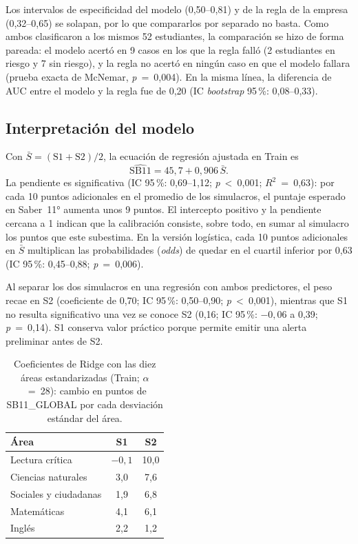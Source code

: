 \documentclass[10pt,letterpaper,twocolumn]{article}
\begin{document}
Los intervalos de especificidad del modelo (0,50--0,81) y de la regla de la empresa (0,32--0,65) se solapan, por lo que compararlos por separado no basta. Como ambos clasificaron a los mismos 52 estudiantes, la comparación se hizo de forma pareada: el modelo acertó en 9 casos en los que la regla falló (2 estudiantes en riesgo y 7 sin riesgo), y la regla no acertó en ningún caso en que el modelo fallara (prueba exacta de McNemar, \textit{p}~=~0,004). En la misma línea, la diferencia de AUC entre el modelo y la regla fue de 0,20 (IC \textit{bootstrap} 95\,\%: 0,08--0,33).

\subsection{Interpretación del modelo}

Con $\bar{S}=(\text{S1}+\text{S2})/2$, la ecuación de regresión ajustada en Train es
\begin{equation}
\label{eq:modelo}
\widehat{\text{SB11}} = 45{,}7 + 0{,}906\,\bar{S}.
\end{equation}
La pendiente es significativa (IC 95\,\%: 0,69--1,12; \textit{p}~<~0,001; $R^2$~=~0,63): por cada 10 puntos adicionales en el promedio de los simulacros, el puntaje esperado en Saber~11° aumenta unos 9 puntos. El intercepto positivo y la pendiente cercana a 1 indican que la calibración consiste, sobre todo, en sumar al simulacro los puntos que este subestima. En la versión logística, cada 10 puntos adicionales en $\bar{S}$ multiplican las probabilidades (\textit{odds}) de quedar en el cuartil inferior por 0,63 (IC 95\,\%: 0,45--0,88; \textit{p}~=~0,006).

Al separar los dos simulacros en una regresión con ambos predictores, el peso recae en S2 (coeficiente de 0,70; IC 95\,\%: 0,50--0,90; \textit{p}~<~0,001), mientras que S1 no resulta significativo una vez se conoce S2 (0,16; IC 95\,\%: $-0{,}06$ a 0,39; \textit{p}~=~0,14). S1 conserva valor práctico porque permite emitir una alerta preliminar antes de S2.

\begin{table}[!t]
\centering
\footnotesize
\renewcommand{\arraystretch}{1.15}
\begin{tabular}{@{}lcc@{}}
\toprule
\textbf{Área} & \textbf{S1} & \textbf{S2} \\
\midrule
Lectura crítica & $-0{,}1$ & 10,0 \\
Ciencias naturales & 3,0 & 7,6 \\
Sociales y ciudadanas & 1,9 & 6,8 \\
Matemáticas & 4,1 & 6,1 \\
Inglés & 2,2 & 1,2 \\
\bottomrule
\end{tabular}
\caption{Coeficientes de Ridge con las diez áreas estandarizadas (Train; $\alpha$~=~28): cambio en puntos de SB11\_GLOBAL por cada desviación estándar del área.}
\label{tb:ridge}
\end{table}
\end{document}
